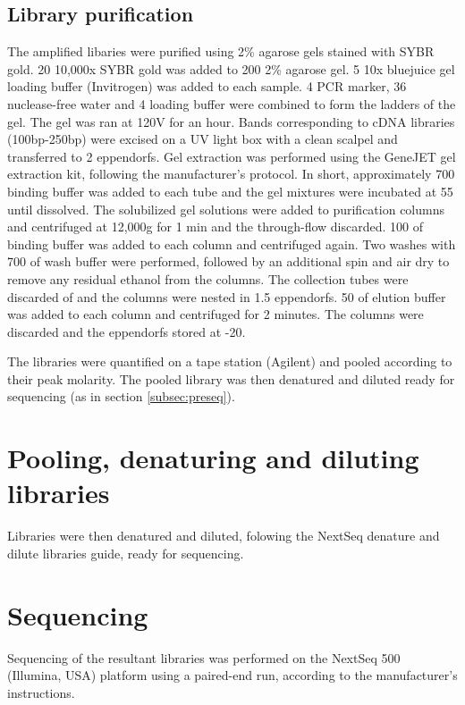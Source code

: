 \subsection{Library purification}
The amplified libaries were purified using 2\% agarose gels stained with SYBR gold.
20\ul{} 10,000x SYBR gold was added to 200\ml{} 2\% agarose gel.
5\ul{} 10x bluejuice gel loading buffer (Invitrogen) was added to each sample.
4\ul{} PCR marker, 36\ul{} nuclease-free water and 4\ul{} loading buffer were combined to form the ladders of the gel.
The gel was ran at 120V for an hour.
Bands corresponding to cDNA libraries (100bp-250bp) were excised on a UV light box with a clean scalpel and transferred to 2\ml{} eppendorfs.
Gel extraction was performed using the GeneJET gel extraction kit, following the manufacturer's protocol.
In short, approximately 700\ul{} binding buffer was added to each tube and the gel mixtures were incubated at 55\C{} until dissolved.
The solubilized gel solutions were added to purification columns and centrifuged at 12,000g for 1 min and the through-flow discarded.
100\ul{} of binding buffer was added to each column and centrifuged again.
Two washes with 700\ul{} of wash buffer were performed, followed by an additional spin and air dry to remove any residual ethanol from the columns.
The collection tubes were discarded of and the columns were nested in 1.5\ml{} eppendorfs.
50\ul{} of elution buffer was added to each column and centrifuged for 2 minutes.
The columns were discarded and the eppendorfs stored at -20\C{}.

The libraries were quantified on a tape station (Agilent) and pooled according to their peak molarity.
The pooled library was then denatured and diluted ready for sequencing (as in section \ref{subsec:preseq}).

\section{Pooling, denaturing and diluting libraries}
Libraries were then denatured and diluted, folowing the NextSeq denature and dilute libraries guide, ready for sequencing.


\section{Sequencing}
Sequencing of the resultant libraries was performed on the NextSeq 500 (Illumina, USA) platform using a paired-end run, according to the manufacturer's instructions.

